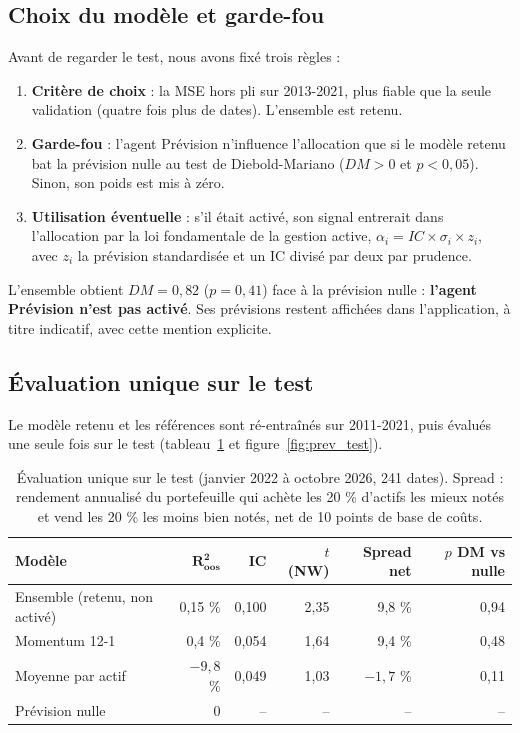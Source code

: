 \subsection{Choix du modèle et garde-fou}

Avant de regarder le test, nous avons fixé trois règles :
\begin{enumerate}
  \item \textbf{Critère de choix} : la MSE hors pli sur 2013-2021, plus fiable que la seule validation (quatre fois plus de dates). L'ensemble est retenu.
  \item \textbf{Garde-fou} : l'agent Prévision n'influence l'allocation que si le modèle retenu bat la prévision nulle au test de Diebold-Mariano ($DM > 0$ et $p < 0{,}05$). Sinon, son poids est mis à zéro.
  \item \textbf{Utilisation éventuelle} : s'il était activé, son signal entrerait dans l'allocation par la loi fondamentale de la gestion active, $\alpha_i = IC \times \sigma_i \times z_i$, avec $z_i$ la prévision standardisée et un IC divisé par deux par prudence.
\end{enumerate}
L'ensemble obtient $DM = 0{,}82$ ($p = 0{,}41$) face à la prévision nulle : \textbf{l'agent Prévision n'est pas activé}. Ses prévisions restent affichées dans l'application, à titre indicatif, avec cette mention explicite.

\subsection{Évaluation unique sur le test}

Le modèle retenu et les références sont ré-entraînés sur 2011-2021, puis évalués une seule fois sur le test (tableau~\ref{tab:prev_test} et figure~\ref{fig:prev_test}).

\begin{table}[!htb]
  \centering
  \small
  \caption{Évaluation unique sur le test (janvier 2022 à octobre 2026, 241 dates). Spread : rendement annualisé du portefeuille qui achète les 20 \% d'actifs les mieux notés et vend les 20 \% les moins bien notés, net de 10 points de base de coûts.}
  \label{tab:prev_test}
  \begin{tabular}{@{}l r r r r r@{}}
    \toprule
    \textbf{Modèle} & $\boldsymbol{R^2_{oos}}$ & \textbf{IC} & \textbf{$t$ (NW)} & \textbf{Spread net} & \textbf{$p$ DM vs nulle} \\
    \midrule
    Ensemble (retenu, non activé) & 0,15 \% & 0,100 & 2,35 & 9,8 \% & 0,94 \\
    Momentum 12-1 & 0,4 \% & 0,054 & 1,64 & 9,4 \% & 0,48 \\
    Moyenne par actif & $-9{,}8$ \% & 0,049 & 1,03 & $-1{,}7$ \% & 0,11 \\
    Prévision nulle & 0 & -- & -- & -- & -- \\
    \bottomrule
  \end{tabular}
\end{table}

